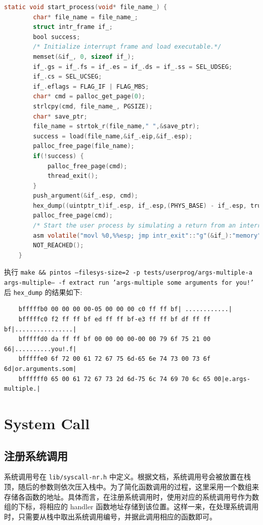 \documentclass{article}
\begin{document}
\begin{lstlisting}[language=C]
	static void start_process(void* file_name_) { 
		char* file_name = file_name_; 
		struct intr_frame if_; 
		bool success;
		/* Initialize interrupt frame and load executable.*/ 
		memset(&if_, 0, sizeof if_); 
		if_.gs = if_.fs = if_.es = if_.ds = if_.ss = SEL_UDSEG; 
		if_.cs = SEL_UCSEG; 
		if_.eflags = FLAG_IF | FLAG_MBS;
		char* cmd = palloc_get_page(0); 
		strlcpy(cmd, file_name_, PGSIZE);
		char* save_ptr; 
		file_name = strtok_r(file_name," ",&save_ptr); 
		success = load(file_name,&if_.eip,&if_.esp); 
		palloc_free_page(file_name);
		if(!success) { 
			palloc_free_page(cmd); 
			thread_exit(); 
		}
		push_argument(&if_.esp, cmd); 
		hex_dump((uintptr_t)if_.esp, if_.esp,(PHYS_BASE) - if_.esp, true); 
		palloc_free_page(cmd);
		/* Start the user process by simulating a return from an interrupt, implemented by intr_exit(in threads/intr-stubs.S).  Because intr_exit takes all of its arguments on the stack in the form of a`struct intr_frame', we just point the stack pointer(%esp) to our stack frame and jump to it.*/
		asm volatile("movl %0,%%esp; jmp intr_exit"::"g"(&if_):"memory"); 
		NOT_REACHED(); 
	}
\end{lstlisting}

执行 \texttt{make \&\& pintos --filesys-size=2 -p tests/userprog/args-multiple-a args-multiple-- -f extract run 'args-multiple some arguments for you!'} 后 \texttt{hex\_dump} 的结果如下:

\begin{lstlisting}
	bfffffb0 00 00 00 00-05 00 00 00 c0 ff ff bf| ............|
	bfffffc0 f2 ff ff bf ed ff ff bf-e3 ff ff bf df ff ff bf|................|
	bfffffd0 da ff ff bf 00 00 00 00-00 00 79 6f 75 21 00 66|..........you!.f|
	bfffffe0 6f 72 00 61 72 67 75 6d-65 6e 74 73 00 73 6f 6d|or.arguments.som| 
	bffffff0 65 00 61 72 67 73 2d 6d-75 6c 74 69 70 6c 65 00|e.args-multiple.|
\end{lstlisting}

\section{System Call}

\subsection{注册系统调用}

系统调用号在 \texttt{lib/syscall-nr.h} 中定义。根据文档，系统调用号会被放置在栈顶，随后的参数则依次压入栈中。为了简化函数调用的过程，这里采用一个数组来存储各函数的地址。具体而言，在注册系统调用时，使用对应的系统调用号作为数组的下标，将相应的 handler 函数地址存储到该位置。这样一来，在处理系统调用时，只需要从栈中取出系统调用编号，并据此调用相应的函数即可。
\end{document}
